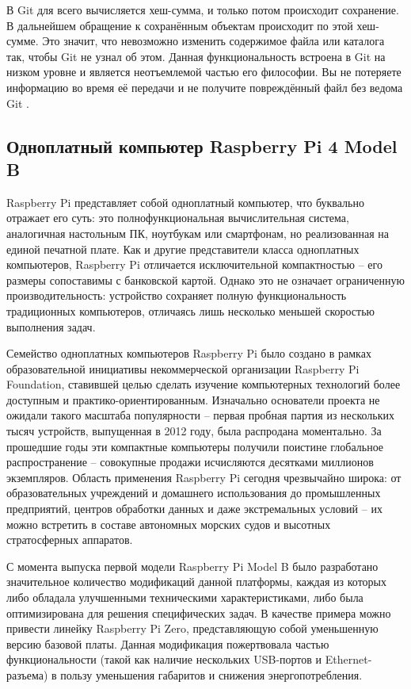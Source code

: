 В Git для всего вычисляется хеш-сумма, и только потом происходит сохранение. В
дальнейшем обращение к сохранённым объектам происходит по этой хеш-сумме. Это
значит, что невозможно изменить содержимое файла или каталога так, чтобы Git не узнал об этом. Данная функциональность встроена в Git на низком уровне и является неотъемлемой частью его философии. Вы не потеряете информацию во время её передачи и не получите повреждённый файл без ведома Git \cite{ProGit}.

\subsection{Одноплатный компьютер Raspberry Pi 4 Model B}

Raspberry Pi представляет собой одноплатный компьютер, что буквально отражает его суть: это полнофункциональная вычислительная система, аналогичная настольным ПК, ноутбукам или смартфонам, но реализованная на единой печатной плате. Как и другие представители класса одноплатных компьютеров, Raspberry Pi отличается исключительной компактностью – его размеры сопоставимы с банковской картой. Однако это не означает ограниченную производительность: устройство сохраняет полную функциональность традиционных компьютеров, отличаясь лишь несколько меньшей скоростью выполнения задач.

Семейство одноплатных компьютеров Raspberry Pi было создано в рамках образовательной инициативы некоммерческой организации Raspberry Pi Foundation, ставившей целью сделать изучение компьютерных технологий более доступным и практико-ориентированным. Изначально основатели проекта не ожидали такого масштаба популярности – первая пробная партия из нескольких тысяч устройств, выпущенная в 2012 году, была распродана моментально. За прошедшие годы эти компактные компьютеры получили поистине глобальное распространение – совокупные продажи исчисляются десятками миллионов экземпляров. Область применения Raspberry Pi сегодня чрезвычайно широка: от образовательных учреждений и домашнего использования до промышленных предприятий, центров обработки данных и даже экстремальных условий – их можно встретить в составе автономных морских судов и высотных стратосферных аппаратов.

С момента выпуска первой модели Raspberry Pi Model B было разработано значительное количество модификаций данной платформы, каждая из которых либо обладала улучшенными техническими характеристиками, либо была оптимизирована для решения специфических задач. В качестве примера можно привести линейку Raspberry Pi Zero, представляющую собой уменьшенную версию базовой платы. Данная модификация пожертвовала частью функциональности (такой как наличие нескольких USB-портов и Ethernet-разъема) в пользу уменьшения габаритов и снижения энергопотребления.

